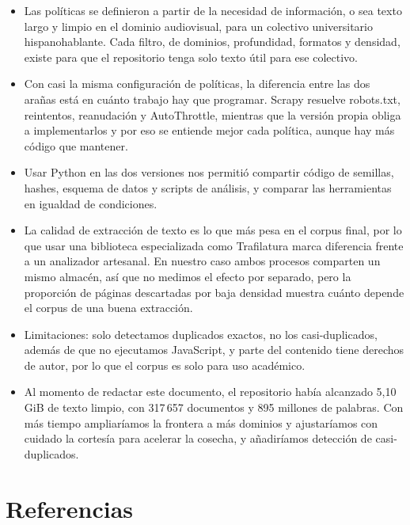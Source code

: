 \documentclass[11pt,spanish]{article}
\begin{document}
\begin{itemize}[label=\textbullet, leftmargin=*]
    \item Las políticas se definieron a partir de la necesidad de información, o sea texto largo y limpio en el dominio audiovisual, para un colectivo universitario hispanohablante. Cada filtro, de dominios, profundidad, formatos y densidad, existe para que el repositorio tenga solo texto útil para ese colectivo.
    \item Con casi la misma configuración de políticas, la diferencia entre las dos arañas está en cuánto trabajo hay que programar. Scrapy resuelve robots.txt, reintentos, reanudación y AutoThrottle, mientras que la versión propia obliga a implementarlos y por eso se entiende mejor cada política, aunque hay más código que mantener.
    \item Usar Python en las dos versiones nos permitió compartir código de semillas, hashes, esquema de datos y scripts de análisis, y comparar las herramientas en igualdad de condiciones.
    \item La calidad de extracción de texto es lo que más pesa en el corpus final, por lo que usar una biblioteca especializada como Trafilatura marca diferencia frente a un analizador artesanal. En nuestro caso ambos procesos comparten un mismo almacén, así que no medimos el efecto por separado, pero la proporción de páginas descartadas por baja densidad muestra cuánto depende el corpus de una buena extracción.
    \item Limitaciones: solo detectamos duplicados exactos, no los casi-duplicados, además de que no ejecutamos JavaScript, y parte del contenido tiene derechos de autor, por lo que el corpus es solo para uso académico.
    \item Al momento de redactar este documento, el repositorio había alcanzado 5,10 GiB de texto limpio, con 317\,657 documentos y 895 millones de palabras. Con más tiempo ampliaríamos la frontera a más dominios y ajustaríamos con cuidado la cortesía para acelerar la cosecha, y añadiríamos detección de casi-duplicados.
\end{itemize}

\section{Referencias}
\end{document}
